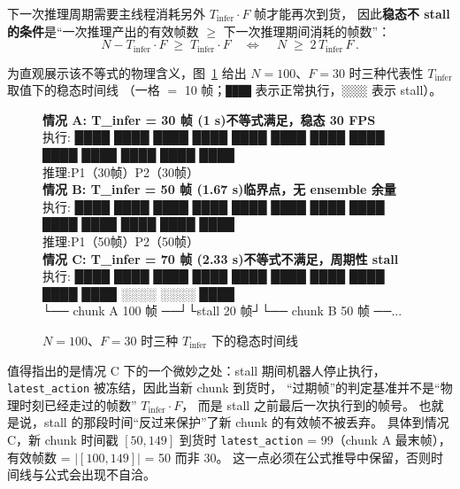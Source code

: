 下一次推理周期需要主线程消耗另外 $T_{\text{infer}} \cdot F$ 帧才能再次到货，
因此\textbf{稳态不 stall 的条件}是``一次推理产出的有效帧数 $\geq$
下一次推理期间消耗的帧数''：
\begin{equation}
  N - T_{\text{infer}} \cdot F \;\geq\; T_{\text{infer}} \cdot F
  \quad\Longleftrightarrow\quad
  \boxed{\,N \;\geq\; 2 \, T_{\text{infer}} \, F\,}.
\end{equation}

为直观展示该不等式的物理含义，图~\ref{fig:async-inf-three-cases} 给出
$N=100$、$F=30$ 时三种代表性 $T_{\text{infer}}$ 取值下的稳态时间线
（一格 $=$ 10 帧；\texttt{████} 表示正常执行，\texttt{░░░░} 表示 stall）。

\begin{figure}[htbp]
  \centering
  \begin{minipage}{0.95\linewidth}
    \scriptsize\ttfamily
    \textbf{情况 A: T\_infer = 30 帧 (1 s)\quad 不等式满足，稳态 30 FPS}\\[2pt]
    执行: ████ ████ ████ ████ ████ ████ ████ ████ ████ ████ ████ ████ ████\\
    推理:\hspace{8em}P1（30帧）\hspace{6.5em}P2（30帧）\\[6pt]

    \textbf{情况 B: T\_infer = 50 帧 (1.67 s)\quad 临界点，无 ensemble 余量}\\[2pt]
    执行: ████ ████ ████ ████ ████ ████ ████ ████ ████ ████ ████ ████ ████\\
    推理:\hspace{8em}P1（50帧）\hspace{8.5em}P2（50帧）\\[6pt]

    \textbf{情况 C: T\_infer = 70 帧 (2.33 s)\quad 不等式不满足，周期性 stall}\\[2pt]
    执行: ████ ████ ████ ████ ████ ████ ████ ████ ████ ████ ░░░░ ░░░░ ████\\
    \hspace{2em}└── chunk A 100 帧 ──┘\hspace{1em}└stall 20 帧┘\hspace{0.5em}└── chunk B 50 帧 ──...
  \end{minipage}
  \caption{$N=100$、$F=30$ 时三种 $T_{\text{infer}}$ 下的稳态时间线}
  \label{fig:async-inf-three-cases}
\end{figure}

值得指出的是情况 C 下的一个微妙之处：stall 期间机器人停止执行，
\texttt{latest\_action} 被冻结，因此当新 chunk 到货时，
``过期帧''的判定基准并不是``物理时刻已经走过的帧数'' $T_{\text{infer}} \cdot F$，
而是 stall 之前最后一次执行到的帧号。
也就是说，stall 的那段时间``反过来保护''了新 chunk 的有效帧不被丢弃。
具体到情况 C，新 chunk 时间戳 $[50, 149]$ 到货时
\texttt{latest\_action} = 99（chunk A 最末帧），
有效帧数 = $|[100, 149]|$ = 50 而非 30。
这一点必须在公式推导中保留，否则时间线与公式会出现不自洽。


